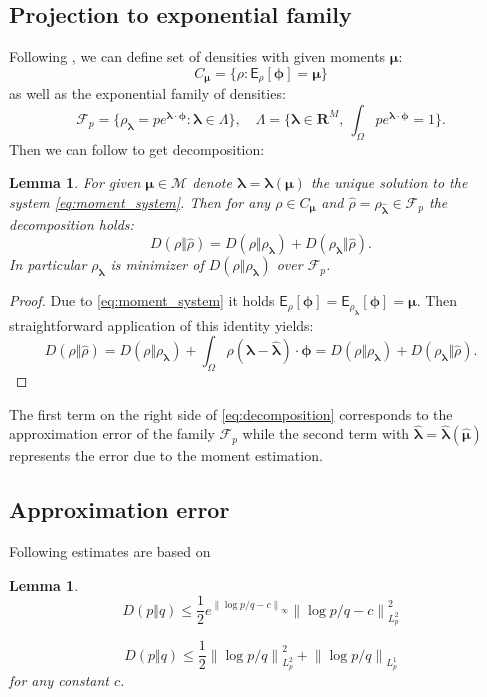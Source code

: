 \documentclass{article}
\newtheorem{lemma}[theorem]{Lemma}
\def\vc#1{\mathbf{\boldsymbol{#1}}}     %
\def \E{{\mathsf E}}
\newcommand{\norm}[1]{\left\lVert#1\right\rVert}
\def\R{\mathbf{R}}
\def\vl{{\vc\lambda}}
\def\estvl{{\vc{\hat\lambda}}}
\def\estrho{\hat\rho}
\def\vmu{\vc\mu}
\def\estvmu{{\vc{\hat\mu}}}
\def\vphi{\vc\phi}
\begin{document}
\subsection{Projection to exponential family}

Following \cite{Barron1991}, we can define set of densities with given moments $\vmu$:
\[
    C_{\vmu} = \{ \rho : \E_\rho[\vphi] = \vmu \}
\]
as well as the exponential family of densities:
\[
    \mathcal F_{p} = \{ \rho_\vl = 
    p e^{\vl\cdot\vphi} :
    \vl \in \Lambda\},\quad \Lambda = 
    \{\vl\in\R^M,\ \int_\Omega p e^{\vl\cdot\vphi} = 1\}.
\]
Then we can follow \cite[Lemma 2]{Barron1991} to get decomposition:
\begin{lemma}
\label{thm:decomposition}
For given $\vmu \in \mathcal M$ denote $\vl =\vl(\vmu)$ the unique solution to the system \eqref{eq:moment_system}. Then for any $\rho \in C_{\vmu}$ and $\estrho=\rho_\estvl \in\mathcal F_p$ the decomposition holds:
\begin{equation}
    \label{eq:decomposition}
    D(\rho\Vert\estrho) = D(\rho\Vert\rho_{\vl}) + D(\rho_{\vl}\Vert
    \estrho).
\end{equation}
In particular $\rho_{\vl}$ is minimizer of $D(\rho\Vert\rho_{\vl})$ over $\mathcal F_p$.
\end{lemma}
\begin{proof}
Due to \eqref{eq:moment_system} it holds $\E_{\rho}[\vphi] = \E_{\rho_{\vl}}[\vphi] = \vmu$. Then straightforward application of this identity yields:
\[
 D(\rho\Vert\estrho) = D(\rho\Vert\rho_{\vl}) 
 + \int_\Omega \rho (\vl - \estvl)\cdot \vc \phi = D(\rho\Vert\rho_{\vl}) + D(\rho_{\vl}\Vert\estrho).
\]
\end{proof}
The first term on the right side of \eqref{eq:decomposition} corresponds to the approximation error of the family $\mathcal F_p$ while the second term with $\estvl = \estvl(\estvmu)$ represents the error due to the moment estimation. 

\subsection{Approximation error}
Following estimates are based on \cite[Lemma 2]{Barron1991} 
\begin{lemma} 
  \begin{equation}
      \label{eq:l2_estimate}
      D(p\Vert q) \le \frac{1}{2}e^{\norm{\log p/q - c}_\infty} \norm{\log p/ q - c}_{L^2_p}^2
  \end{equation}

  
  \begin{equation}
      \label{eq:l1_estimate}
      D(p\Vert q) \le \frac{1}{2}\norm{\log p/ q}^2_{L^2_p} + \norm{\log p/ q}_{L^1_p}
  \end{equation}
 for any constant $c$.
\end{lemma}
\end{document}
